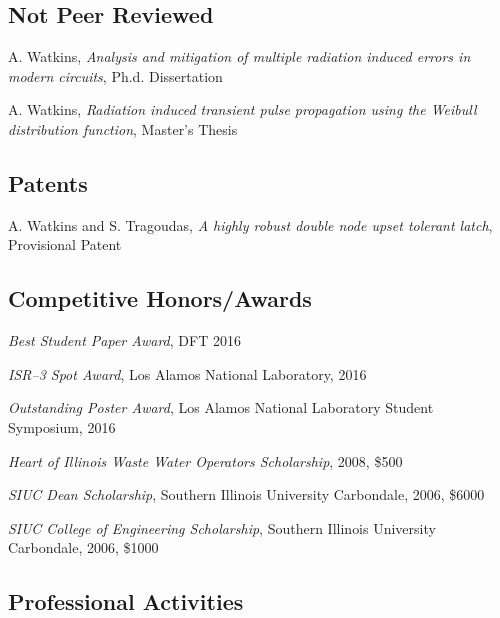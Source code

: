 \documentclass[letterpaper]{article}
\renewenvironment{itemize}{
  \begin{list}{}{
    \setlength{\leftmargin}{1.5em}
  }
}{
  \end{list}
}
\begin{document}
\subsection*{Not Peer Reviewed}

\begin{itemize}
	\item A. Watkins, \emph{Analysis and mitigation of multiple radiation induced errors in modern circuits}, Ph.d. Dissertation
	
	\item A. Watkins, \emph{Radiation induced transient pulse propagation using the Weibull distribution function}, Master's Thesis
\end{itemize}

\subsection*{Patents}

\begin{itemize}
	\item A. Watkins and S. Tragoudas, \emph{A highly robust double node upset tolerant latch}, Provisional Patent 
\end{itemize}

\subsection*{Competitive Honors/Awards}

\begin{itemize}
	
	\item \emph{Best Student Paper Award}, DFT 2016
	\item \emph{ISR--3 Spot Award}, Los Alamos National Laboratory, 2016
	\item \emph{Outstanding Poster Award}, Los Alamos National Laboratory Student Symposium, 2016
	\item \emph{Heart of Illinois Waste Water Operators Scholarship}, 2008, \$500
	\item \emph{SIUC Dean Scholarship}, Southern Illinois University Carbondale, 2006, \$6000
	\item \emph{SIUC College of Engineering Scholarship}, Southern Illinois University Carbondale, 2006, \$1000
	
\end{itemize}

\subsection*{Professional Activities}
\end{document}
